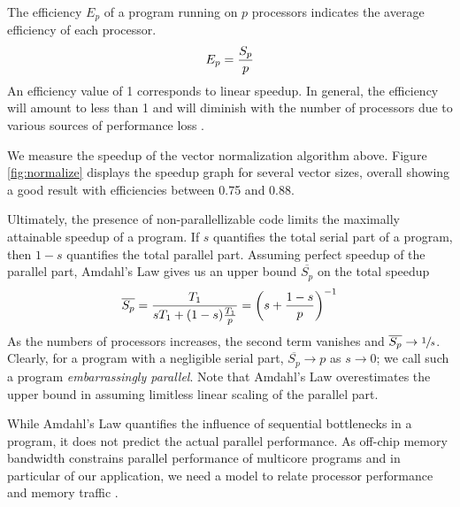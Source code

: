 \documentclass[a4paper,11pt, oneside]{report}
\newcommand{\concept}[1]{\emph{#1}}
\newcommand{\strongpar}{\medskip\par}
\begin{document}
 The efficiency $E_p$ of a program running on $p$ processors indicates the average efficiency of each processor.
\begin{equation}
E_p = {S_p\over p}
\end{equation}
An efficiency value of 1 corresponds to linear speedup. In general, the efficiency will amount to less than 1 and will diminish with the number of processors due to various sources of performance loss \cite{snyder-lin}.

\example We measure the speedup of the vector normalization algorithm above. Figure \ref{fig:normalize} displays the speedup graph for several vector sizes, overall showing a good result with efficiencies between 0.75 and 0.88.


 Ultimately, the presence of non-parallellizable code limits the maximally attainable speedup of a program. If $s$ quantifies the total serial part of a program, then $1- s$ quantifies the total parallel part. Assuming perfect speedup of the parallel part, Amdahl's Law gives us an upper bound $\overline{S_p}$ on the total speedup
\begin{equation}
\overline{S_p} = \frac{T_1}{sT_1 + (1-s) {T_1 \over p}} = \left( s + {1 - s \over p} \right)^{-1}
\end{equation}
As the numbers of processors increases, the second term vanishes and $\overline{S_p} \to \sfrac{1}{s}$. Clearly, for a program with a negligible serial part, $\overline{S_p} \to p$ as $s \to 0$; we call such a program \concept{embarrassingly parallel}. Note that Amdahl's Law overestimates the upper bound in assuming limitless linear scaling of the parallel part.

\strongpar
While Amdahl's Law quantifies the influence of sequential bottlenecks in a program, it does not predict the actual parallel performance. As off-chip memory bandwidth constrains parallel performance of multicore programs and in particular of our application, we need a model to relate processor performance and memory traffic \cite{williams-waterman-patterson}.
\end{document}
